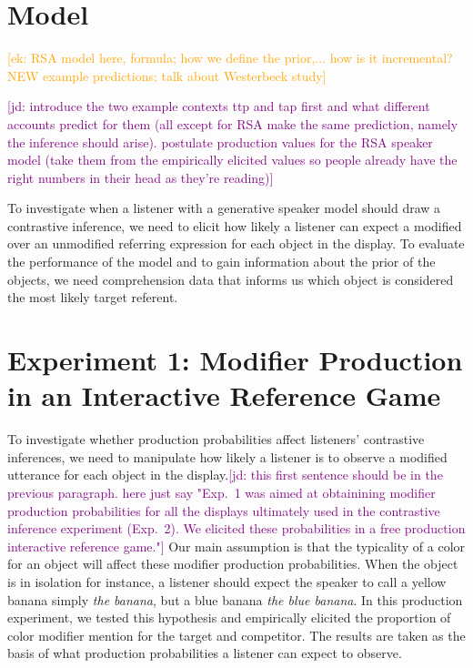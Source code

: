 \documentclass[10pt,letterpaper]{article}
\newcommand{\ek}[1]{\textcolor{Orange}{[ek: #1]}}
\newcommand{\jd}[1]{\textcolor{Purple}{[jd: #1]}}
\begin{document}


\section{Model}

\ek{RSA model here, formula; how we define the prior,...
how is it incremental? NEW
example predictions;
talk about Westerbeek study}

\jd{introduce the two example contexts ttp and tap first and what different accounts predict for them (all except for RSA make the same prediction, namely the inference should arise). postulate production values for the RSA speaker model (take them from the empirically elicited values so people already have the right numbers in their head as they're reading)}

To investigate when a listener with a generative speaker model should draw a contrastive inference, we need to elicit how likely a listener can expect a modified over an unmodified referring expression for each object in the display. To evaluate the performance of the model and to gain information about the prior of the objects, we need comprehension data that informs us which object is considered the most likely target referent.


\section{Experiment 1: Modifier Production in an Interactive Reference Game}

To investigate whether production probabilities affect listeners' contrastive inferences, we need to manipulate how likely a listener is to observe a modified utterance for each object in the display.\jd{this first sentence should be in the previous paragraph. here just say "Exp.~1 was aimed at obtainining modifier production probabilities for all the displays ultimately used in the contrastive inference  experiment (Exp.~2). We elicited these probabilities in a free production interactive reference game."} Our main assumption is that the typicality of a color for an object will affect these modifier production probabilities. When the object is in isolation for instance, a listener should expect the speaker to call a yellow banana simply \textit{the banana}, but a blue banana \textit{the blue banana}. In this production experiment, we tested this hypothesis and empirically elicited the proportion of color modifier mention for the target and competitor. The results are taken as the basis of what production probabilities a listener can expect to observe.
\end{document}
